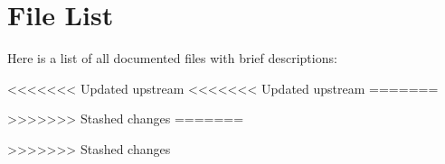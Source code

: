 \section{File List}
Here is a list of all documented files with brief descriptions\+:\begin{DoxyCompactList}
\item{}
\item{}
<<<<<<< Updated upstream
<<<<<<< Updated upstream
=======
\item{}
>>>>>>> Stashed changes
=======
\item{}
>>>>>>> Stashed changes
\item{}
\item{}
\end{DoxyCompactList}
